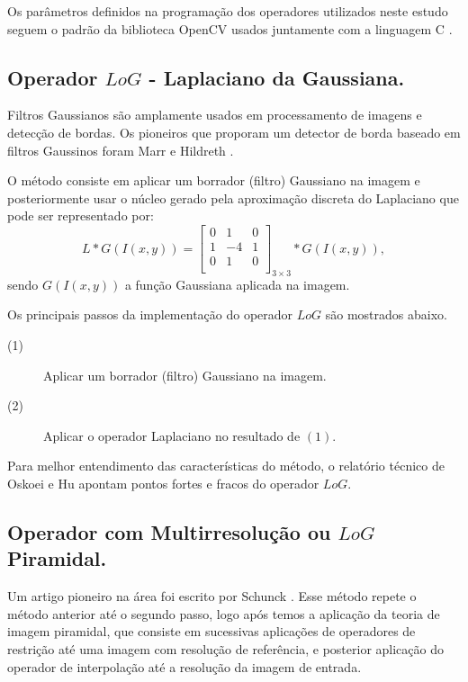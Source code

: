 \documentclass[a4paper]{article} %
\begin{document}
Os parâmetros definidos na programação dos operadores utilizados neste estudo seguem o padrão da biblioteca  OpenCV \cite{opencv_3_2016} usados juntamente com a linguagem C \cite{ling_c}.

\subsection{Operador $LoG$ - Laplaciano da Gaussiana.}

Filtros Gaussianos são amplamente usados em processamento  de imagens e detecção de bordas. Os pioneiros que proporam um detector de borda baseado em filtros Gaussinos foram Marr e Hildreth \cite{marr1980theory}.

O método consiste em aplicar um borrador (filtro) Gaussiano na imagem e posteriormente usar o núcleo gerado pela aproximação discreta do Laplaciano que pode ser representado por: 
$$L* G(I(x,y))=\left[
\begin{array}{lrl}
 0 &  1 & 0\\
 1 & -4 & 1\\
 0 &  1 & 0\\
\end{array}
\right]_{3 \times 3}* G(I(x,y)),$$
sendo $G(I(x,y))$ a função Gaussiana aplicada na imagem.

Os principais passos da implementação do operador $LoG$ são mostrados abaixo.

\begin{description}
\item[(1)] Aplicar um borrador (filtro) Gaussiano na imagem.
\item[(2)] Aplicar o operador Laplaciano no resultado de $(1)$.
\end{description}

Para melhor entendimento das características do método, o relatório técnico de Oskoei e Hu \cite{oskoei2010survey} apontam pontos fortes e fracos do operador $LoG$.


\subsection{Operador com Multirresolução ou $LoG$ Piramidal.}


Um artigo pioneiro na área foi escrito por Schunck \cite{schunck1987scale}. Esse método repete o método anterior até o segundo passo, logo após temos a aplicação da teoria de imagem piramidal, que consiste em sucessivas aplicações de operadores de restrição até uma imagem com resolução de referência, e posterior aplicação do operador de interpolação até a resolução da imagem de entrada. 
\end{document}
